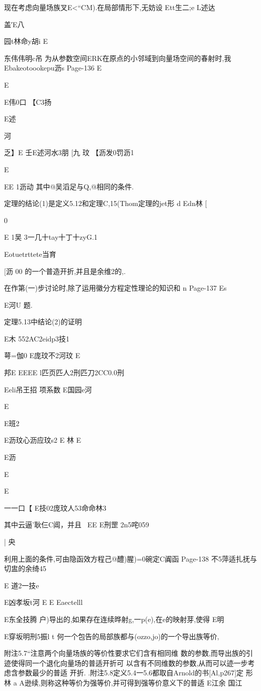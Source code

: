 {{{现在考虑向量场族叉E<“CM).在局部情形下,无妨设
Ett生二;e
L述达

盖′E八

园t林命y胡i
E

东伟伟明c吊
为从参数空间ERK在原点的小邻域到向量场空间的春射时,我
Ebakeotoookepu沥s
Page-136
E

E

E伟0口
【C3扬

E述

河

乏】E
壬E述河水3朋
[九
玟
【沥发0罚沥1

E
{EE
1沥动
其中@吴滔足与Q,@相同的条件.

定理的结论(1)是定义5.12和定理C,15(Thom定理的jet形
d
Edn林
[

0

E
1吴
3一几十tay十丁十zyG.1

Eotuetrttete当育

[沥
00
的一个普造开折,并且是余维2的,.

在作第(一)步讨论时,除了运用徽分方程定性理论的知识和
n
Page-137
Es

E河U
题.

定理5.13中结论(2)的证明

E木
552AC2eidp3技1
{萼=伽0
E庞玟不2河玟
E

邦E
EEEE
l匹页匹人2刑匹刀2CC0.0刑

Eeli吊王招
项系数
E国园e河

E

{E班2

E沥玟心沥应玟s2
E
林
E

E沥

E

E
{一一口【
E技02庞玟人53命命林3

其中云逼'耿仨C阊，并且
~EE
E刑罡
2n5咤059

|
央

利用上面的条件,可由隐函效方程己@醴)腥)=0碗定C阗函
Page-138
不5萍适扎抚与切盅的余绮45

E
道2一技e

E凶孝坂t河
E
E
Eaectelll

E东全技腾
户)导出的,如果存在连续晔射g,一p(e),在e的映射芽,使得
E明

E穿坂明刑5振l
t
何一个包告的局部族都与(ozzo,jo)的一个导出族等价,

附注5.7“注意两个向量场族的等价性要求它们含有相同维
数的参数,而导出族的引迹使得同一个退化向量场的普适开折可
以含有不同维数的参数,从而可以迹一步考虑含参数最少的普适
开折.
.附注5.8定义5.4一5.6都取自Arnold的书[Al,p267]定
形林
a
A逊续,则称这种等价为强等价,并可得到强等价意义下的普适
E江余
国江

}}}}}}}
